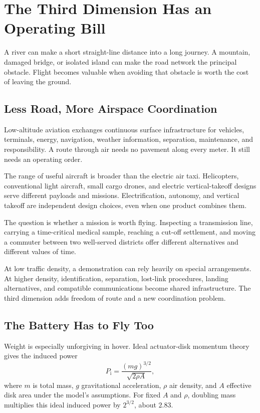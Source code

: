 \section{The Third Dimension Has an Operating Bill}

A river can make a short straight-line distance into a long journey. A mountain, damaged bridge, or isolated island can make the road network the principal obstacle. Flight becomes valuable when avoiding that obstacle is worth the cost of leaving the ground.

\subsection{Less Road, More Airspace Coordination}

Low-altitude aviation exchanges continuous surface infrastructure for vehicles, terminals, energy, navigation, weather information, separation, maintenance, and responsibility. A route through air needs no pavement along every meter. It still needs an operating order.

The range of useful aircraft is broader than the electric air taxi. Helicopters, conventional light aircraft, small cargo drones, and electric vertical-takeoff designs serve different payloads and missions. Electrification, autonomy, and vertical takeoff are independent design choices, even when one product combines them.

The question is whether a mission is worth flying. Inspecting a transmission line, carrying a time-critical medical sample, reaching a cut-off settlement, and moving a commuter between two well-served districts offer different alternatives and different values of time.

At low traffic density, a demonstration can rely heavily on special arrangements. At higher density, identification, separation, lost-link procedures, landing alternatives, and compatible communications become shared infrastructure. The third dimension adds freedom of route and a new coordination problem.

\subsection{The Battery Has to Fly Too}

Weight is especially unforgiving in hover. Ideal actuator-disk momentum theory gives the induced power
\begin{equation}
 P_{\mathrm i}=\frac{(mg)^{3/2}}{\sqrt{2\rho A}},
\end{equation}
where $m$ is total mass, $g$ gravitational acceleration, $\rho$ air density, and $A$ effective disk area under the model's assumptions. For fixed $A$ and $\rho$, doubling mass multiplies this ideal induced power by $2^{3/2}$, about $2.83$.

